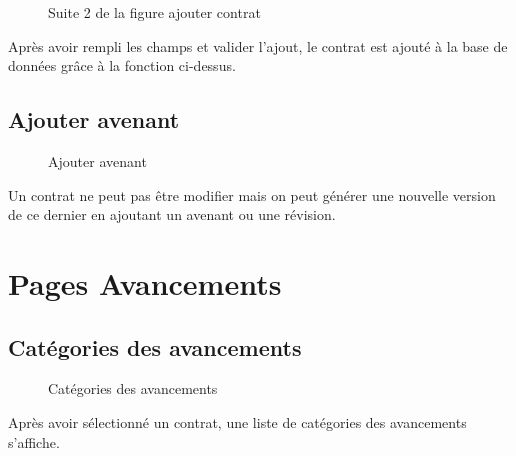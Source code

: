\documentclass[a4paper]{report}
\begin{document}
\begin{doublespace}
\begin{figure}[H]
\begin{center}
		\caption{Suite 2 de la figure ajouter contrat}
	\end{center}
\end{figure}
Après avoir rempli les champs et valider l'ajout, le contrat est ajouté à la base de données grâce à la fonction ci-dessus.
\subsection{Ajouter avenant}
\begin{figure}[H]
	\begin{center}
		\caption{Ajouter avenant}
	\end{center}
\end{figure}
Un contrat ne peut pas être modifier mais on peut générer une nouvelle version de ce dernier en ajoutant un avenant ou une révision.
\section{Pages Avancements}
\subsection{Catégories des avancements}
\begin{figure}[H]
	\begin{center}
		\caption{Catégories des avancements}
	\end{center}
\end{figure}
Après avoir sélectionné un contrat, une liste de catégories des avancements s'affiche.

\end{doublespace}
\end{document}
